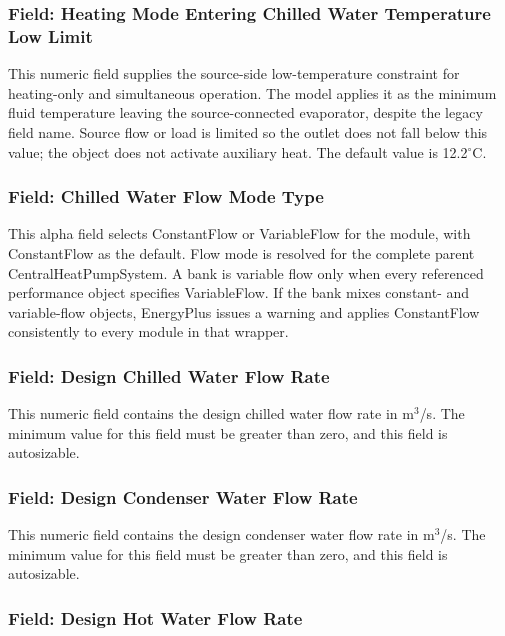 \subsubsection{Field: Heating Mode Entering Chilled Water Temperature Low Limit}\label{field-heating-mode-entering-chilled-water-temperature-low-limit}

This numeric field supplies the source-side low-temperature constraint for heating-only and simultaneous operation. The model applies it as the minimum fluid temperature leaving the source-connected evaporator, despite the legacy field name. Source flow or load is limited so the outlet does not fall below this value; the object does not activate auxiliary heat. The default value is 12.2$^\circ$C.

\subsubsection{Field: Chilled Water Flow Mode Type}\label{field-chilled-water-flow-mode-type}

This alpha field selects ConstantFlow or VariableFlow for the module, with ConstantFlow as the default. Flow mode is resolved for the complete parent CentralHeatPumpSystem. A bank is variable flow only when every referenced performance object specifies VariableFlow. If the bank mixes constant- and variable-flow objects, EnergyPlus issues a warning and applies ConstantFlow consistently to every module in that wrapper.

\subsubsection{Field: Design Chilled Water Flow Rate}\label{field-design-chilled-water-flow-rate-8}

This numeric field contains the design chilled water flow rate in m\(^{3}\)/s. The minimum value for this field must be greater than zero, and this field is autosizable.

\subsubsection{Field: Design Condenser Water Flow Rate}\label{field-design-condenser-water-flow-rate-7}

This numeric field contains the design condenser water flow rate in m\(^{3}\)/s. The minimum value for this field must be greater than zero, and this field is autosizable.

\subsubsection{Field: Design Hot Water Flow Rate}\label{field-design-hot-water-flow-rate-2}


